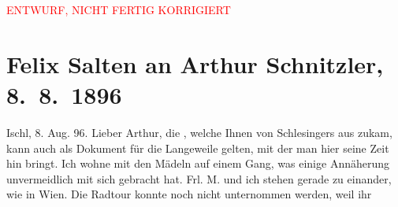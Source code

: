 
\begin{center}
            \textcolor{red}{ENTWURF, NICHT FERTIG KORRIGIERT}
                      \end{center}
            
         
         \renewcommand{\erwaehntePersonen}{Personen: Richard Beer-Hofmann, Paula Beer-Hofmann, Paul Goldmann, Moriz Metzl, Friedrich Mitterwurzer, Wilhelmine Mitterwurzer, Ottilie Salten, Franziska Schlesinger, Emil Schlesinger}
         \renewcommand{\erwaehnteOrte}{Orte: Bad Aussee, Bad Ischl, Skodsborg, Wien}
         \renewcommand{\erwaehnteWerke}{Werke: ?? [Einakter], Anatol, Das Märchen. Schauspiel in drei Aufzügen, Herodes und Mariamne. Eine Tragödie in fünf Aufzügen, Judith. Eine Tragödie in fünf Aufzügen}
               \section[Felix Salten an Arthur Schnitzler, 8. 8. 1896]{ Felix Salten an Arthur Schnitzler, 8. 8. 1896}\nopagebreak{}\rehead{ }\begin{ledgroupsized}[t]{13cm}\normalsize\beginnumbering \toendnotes[C]{\smallbreak\pagebreak[2]} 
\toendnotes[C]{\smallbreak}\pstart
           \raggedleft{}{\pb}Ischl, 8. Aug. 96.\pend
           \pstart
           Lieber Arthur, die \label{K_L03178-112v}\label{K_L03178-112h}, welche Ihnen von Schlesingers aus zukam, kann auch als Dokument für die Langeweile gelten,
               mit der man hier seine Zeit hin bringt. Ich wohne mit den Mädeln auf einem Gang, was
               einige Annäherung unvermeidlich mit sich gebracht hat. Frl. M. und ich stehen gerade zu einander, wie in Wien. Die Radtour konnte noch nicht unternommen werden, weil ihr

\end{ledgroupsized}
